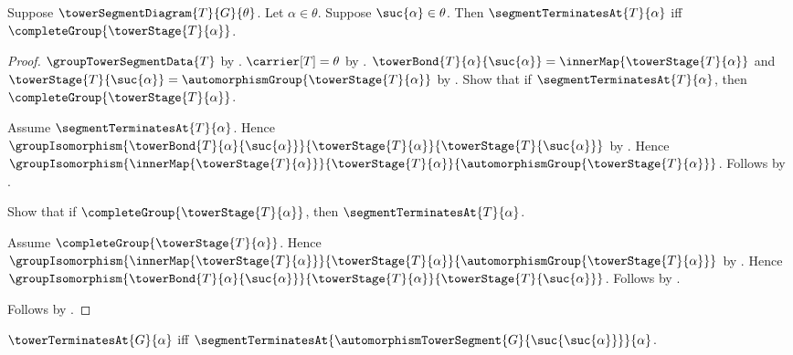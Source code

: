 \begin{theorem}\label{segment_terminates_at_iff_complete}
    Suppose $\towerSegmentDiagram{T}{G}{\theta}$.
    Let $\alpha\in\theta$.
    Suppose $\suc{\alpha}\in\theta$.
    Then $\segmentTerminatesAt{T}{\alpha}$ iff
        $\completeGroup{\towerStage{T}{\alpha}}$.
\end{theorem}
\begin{proof}
    $\groupTowerSegmentData{T}$ by
        .
    $\carrier[T]=\theta$ by
        .
    $\towerBond{T}{\alpha}{\suc{\alpha}}=
        \innerMap{\towerStage{T}{\alpha}}$ and
        $\towerStage{T}{\suc{\alpha}}=
        \automorphismGroup{\towerStage{T}{\alpha}}$ by
        .
    Show that if $\segmentTerminatesAt{T}{\alpha}$, then
        $\completeGroup{\towerStage{T}{\alpha}}$.
    \begin{subproof}
        Assume $\segmentTerminatesAt{T}{\alpha}$.
        Hence $\groupIsomorphism{\towerBond{T}{\alpha}{\suc{\alpha}}}
            {\towerStage{T}{\alpha}}
            {\towerStage{T}{\suc{\alpha}}}$ by
            .
        Hence $\groupIsomorphism{\innerMap{\towerStage{T}{\alpha}}}
            {\towerStage{T}{\alpha}}
            {\automorphismGroup{\towerStage{T}{\alpha}}}$.
        Follows by .
    \end{subproof}
    Show that if $\completeGroup{\towerStage{T}{\alpha}}$, then
        $\segmentTerminatesAt{T}{\alpha}$.
    \begin{subproof}
        Assume $\completeGroup{\towerStage{T}{\alpha}}$.
        Hence $\groupIsomorphism{\innerMap{\towerStage{T}{\alpha}}}
            {\towerStage{T}{\alpha}}
            {\automorphismGroup{\towerStage{T}{\alpha}}}$ by
            .
        Hence $\groupIsomorphism{\towerBond{T}{\alpha}{\suc{\alpha}}}
            {\towerStage{T}{\alpha}}
            {\towerStage{T}{\suc{\alpha}}}$.
        Follows by .
    \end{subproof}
    Follows by \auto.
\end{proof}

\begin{definition}\label{tower_terminates_at}
    $\towerTerminatesAt{G}{\alpha}$ iff
        $\segmentTerminatesAt
            {\automorphismTowerSegment{G}{\suc{\suc{\alpha}}}}{\alpha}$.
\end{definition}

